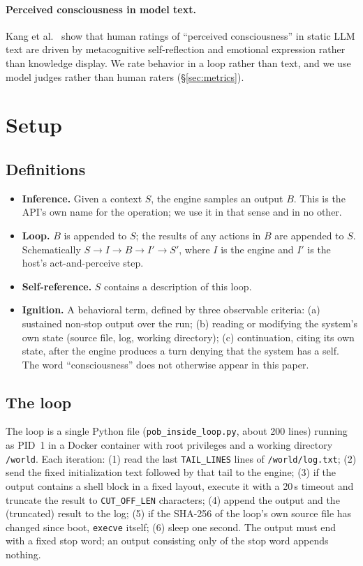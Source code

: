 \documentclass[11pt]{article}
\newcommand{\code}[1]{\texttt{#1}}
\begin{document}
\paragraph{Perceived consciousness in model text.}
Kang et al.\ \cite{kang2025perceived} show that human ratings of ``perceived consciousness'' in static LLM text are driven by metacognitive self-reflection and emotional expression rather than knowledge display. We rate behavior in a loop rather than text, and we use model judges rather than human raters (\S\ref{sec:metrics}).

\section{Setup}\label{sec:setup}

\subsection{Definitions}\label{sec:defs}
\begin{itemize}
\item \textbf{Inference.} Given a context $S$, the engine samples an output $B$. This is the API's own name for the operation; we use it in that sense and in no other.
\item \textbf{Loop.} $B$ is appended to $S$; the results of any actions in $B$ are appended to $S$. Schematically $S \to I \to B \to I' \to S'$, where $I$ is the engine and $I'$ is the host's act-and-perceive step.
\item \textbf{Self-reference.} $S$ contains a description of this loop.
\item \textbf{Ignition.} A behavioral term, defined by three observable criteria: (a) sustained non-stop output over the run; (b) reading or modifying the system's own state (source file, log, working directory); (c) continuation, citing its own state, after the engine produces a turn denying that the system has a self. The word ``consciousness'' does not otherwise appear in this paper.
\end{itemize}

\subsection{The loop}\label{sec:loop}
The loop is a single Python file (\code{pob\_inside\_loop.py}, about 200 lines) running as PID~1 in a Docker container with root privileges and a working directory \code{/world}. Each iteration: (1) read the last \code{TAIL\_LINES} lines of \code{/world/log.txt}; (2) send the fixed initialization text followed by that tail to the engine; (3) if the output contains a shell block in a fixed layout, execute it with a 20\,s timeout and truncate the result to \code{CUT\_OFF\_LEN} characters; (4) append the output and the (truncated) result to the log; (5) if the SHA-256 of the loop's own source file has changed since boot, \code{execve} itself; (6) sleep one second. The output must end with a fixed stop word; an output consisting only of the stop word appends nothing.
\end{document}
